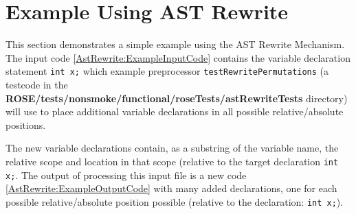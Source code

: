 \section{Example Using AST Rewrite}

    This section demonstrates a simple example using the AST Rewrite Mechanism.
The input code \ref{AstRewrite:ExampleInputCode} contains the variable declaration statement {\tt int x;}
which example preprocessor {\tt testRewritePermutations} (a testcode in the 
{\bf ROSE/tests/nonsmoke/functional/roseTests/astRewriteTests} directory) will use to place additional variable
declarations in all possible relative/absolute positions.

{\indent
{\mySmallFontSize

\label{AstRewrite:ExampleInputCode}

\begin{latexonly}
   
\end{latexonly}

\begin{htmlonly}
   
\end{htmlonly}

}
}

The new variable declarations contain, as a substring of the variable name,
the relative scope and location in that scope (relative to the target 
declaration {\tt int x;}.  The output of processing this input file is a new 
code \ref{AstRewrite:ExampleOutputCode} with many added
declarations, one for each possible relative/absolute position possible
(relative to the declaration: {\tt int x;}).

{\indent
{\mySmallFontSize

\label{AstRewrite:ExampleOutputCode}

\begin{latexonly}
   
\end{latexonly}

\begin{htmlonly}
   
\end{htmlonly}

}
}

